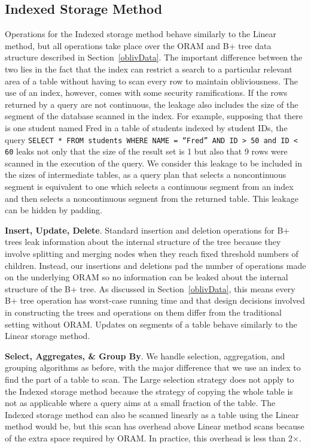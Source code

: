 \documentclass[letterpaper,twocolumn,10pt]{article}
\begin{document}
\subsection{Indexed Storage Method}
Operations for the Indexed storage method behave similarly to the Linear method, but all operations take place over the ORAM and B+ tree data structure described in Section~\ref{oblivData}. The important difference between the two lies in the fact that the index can restrict a search to a particular relevant area of a table without having to scan every row to maintain obliviousness. The use of an index, however, comes with some security ramifications. If the rows returned by a query are not continuous, the leakage also includes the size of the segment of the database scanned in the index. For example, supposing that there is one student named Fred in a table of students indexed by student IDs, the query \texttt{SELECT * FROM students WHERE NAME = ``Fred'' AND ID > 50 and ID < 60} leaks not only that the size of the result set is 1 but also that 9 rows were scanned in the execution of the query. We consider this leakage to be included in the sizes of intermediate tables, as a query plan that selects a noncontinuous segment is equivalent to one which selects a continuous segment from an index and then selects a noncontinuous segment from the returned table. This leakage can be hidden by padding.

  \noindent \textbf{Insert, Update, Delete}.
  Standard insertion and deletion operations for B+ trees leak information about the internal structure of the tree because they involve splitting and merging nodes when they reach fixed threshold numbers of children.
  Instead, our insertions and deletions pad the number of operations made on the underlying ORAM so no information can be leaked about the internal structure of the B+ tree. As discussed in Section~\ref{oblivData}, this means every B+ tree operation has worst-case running time and that design decisions involved in constructing the trees and operations on them differ from the traditional setting without ORAM. Updates on segments of a table behave similarly to the Linear storage method.

  \noindent \textbf{Select, Aggregates, \& Group By}.
We handle selection, aggregation, and grouping algorithms as before, with the major difference that we use an index to find the part of a table to scan. The Large selection strategy does not apply to the Indexed storage method because the strategy of copying the whole table is not as applicable where a query aims at a small fraction of the table. The Indexed storage method can also be scanned linearly as a table using the Linear method would be, but this scan has overhead above Linear method scans because of the extra space required by ORAM. In practice, this overhead is less than 2$\times$.
\end{document}
